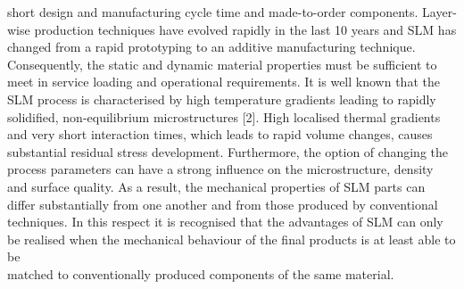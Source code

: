 \documentclass[10pt]{article}
\begin{document}
short design and manufacturing cycle time and made-to-order components. Layer-wise production techniques have evolved rapidly in the last 10 years and SLM has changed from a rapid prototyping to an additive manufacturing technique. Consequently, the static and dynamic material properties must be sufficient to meet in service loading and operational requirements. It is well known that the SLM process is characterised by high temperature gradients leading to rapidly solidified, non-equilibrium microstructures [2]. High localised thermal gradients and very short interaction times, which leads to rapid volume changes, causes substantial residual stress development. Furthermore, the option of changing the process parameters can have a strong influence on the microstructure, density and surface quality. As a result, the mechanical properties of SLM parts can differ substantially from one another and from those produced by conventional techniques. In this respect it is recognised that the advantages of SLM can only be realised when the mechanical behaviour of the final products is at least able to be\\
matched to conventionally produced components of the same material.
\end{document}
